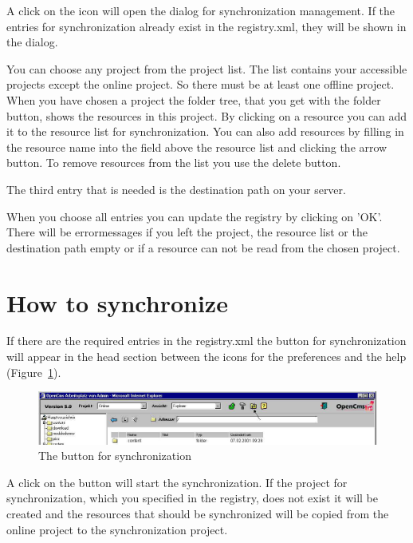 A click on the icon will open the dialog for synchronization
management. If the entries for synchronization already exist in
the {\dir registry.xml}, they will be shown in the dialog.

You can choose any project from the project list. The list
contains your accessible projects except the online project. So
there must be at least one offline project. When you have chosen a
project the folder tree, that you get with the folder button,
shows the resources in this project. By clicking on a resource you
can add it to the resource list for synchronization. You can also
add resources by filling in the resource name into the field above
the resource list and clicking the arrow button. To remove
resources from the list you use the delete button.

The third entry that is needed is the destination path on your
server.

When you choose all entries you can update the registry by
clicking on 'OK'. There will be errormessages if you left the
project, the resource list or the destination path empty or if a
resource can not be read from the chosen project.

\section{How to synchronize}

If there are the required entries in the registry.xml the button
for synchronization will appear in the head section between the
icons for the preferences and the help (Figure~\ref{syncicon}).

\begin{figure}[hbt]
\begin{center}
\includegraphics[width=\sgw]
                   {pics/synchronize/syncico}
\caption[The button for synchronization]
           {The button for synchronization}
\label{syncicon}
\end{center}
\end{figure}

A click on the button will start the synchronization. If the project for synchronization, which you specified in the registry, does not exist it will be created and the resources that should be synchronized will be copied from the online project to the synchronization project.


